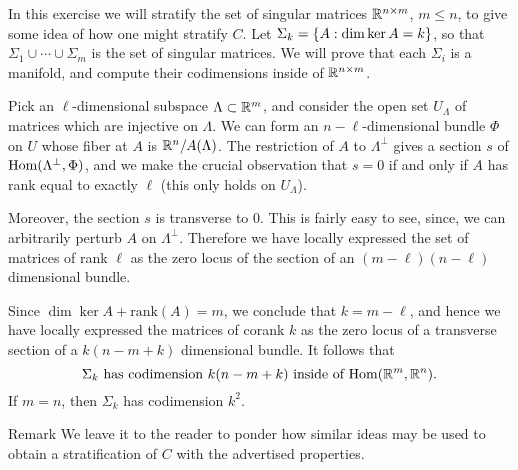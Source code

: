 \begin{xca}[stratifications]
  In this exercise we will stratify the set of singular matrices
  $\mathbb{R}^{n\times m}$, $m\le n$, to give some idea of how one might
  stratify $C$. Let $\Sigma_{k}=\left\{A:\dim \ker A=k\right\}$, so that
  $\Sigma_{1}\cup \cdots \cup \Sigma_{m}$ is the set of singular
  matrices. We will prove that each $\Sigma_{i}$ is a manifold, and
  compute their codimensions inside of $\mathbb{R}^{n\times m}$.

  Pick an $\ell$-dimensional subspace $\Lambda\subset \mathbb{R}^{m}$, and
  consider the open set $U_{\Lambda}$ of matrices which are injective
  on $\Lambda$. We can form an $n-\ell$-dimensional bundle $\Phi$ on $U$
  whose fiber at $A$ is $\mathbb{R}^{n}/A(\Lambda)$. The restriction of $A$ to
  $\Lambda^{\perp}$ gives a section $s$ of $\operatorname{\mathrm{Hom}}(\Lambda^{\perp},\Phi)$,
  and we make the crucial observation that $s=0$ if and only if $A$
  has rank equal to exactly $\ell$ (this only holds on
  $U_{\Lambda}$).

  Moreover, the section $s$ is transverse to
  $0$. This is fairly easy to see, since, we can arbitrarily perturb $A$ on
  $\Lambda^{\perp}$. Therefore we have locally expressed the set of
  matrices of rank $\ell$ as the zero locus of the section of an
  $(m-\ell)(n-\ell)$ dimensional bundle.

  Since $\dim \ker A+\text{rank}(A)=m$, we conclude that $k=m-\ell$,
  and hence we have locally expressed the matrices of corank $k$ as
  the zero locus of a transverse section of a $k(n-m+k)$ dimensional
  bundle. It follows that
  \begin{equation*}
    \Sigma_{k}\text{ has codimension $k(n-m+k)$ inside of $\operatorname{\mathrm{Hom}}(\mathbb{R}^{m},\mathbb{R}^{n})$}.
  \end{equation*}
  If $m=n$, then $\Sigma_{k}$ has codimension $k^{2}$. 
\end{xca}
\begin{clear}{Remark}
  We leave it to the reader to ponder how similar ideas may be used to
  obtain a stratification of $C$ with the advertised properties.
\end{clear}
